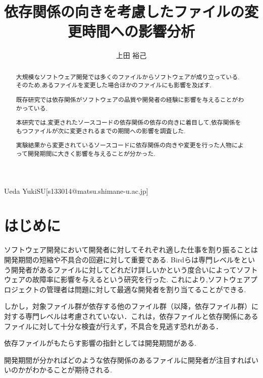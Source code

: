 \documentclass[submit,ses,noauthor]{ipsj} %
\begin{document}
\title{依存関係の向きを考慮したファイルの変更時間への影響分析}

\etitle{}



\author{上田 裕己}{Ueda Yuki}{SU}[s133014@matsu.shimane-u.ac.jp]

\begin{abstract}
大規模なソフトウェア開発では多くのファイルからソフトウェアが成り立っている.
そのため,あるファイルを変更した場合ほかのファイルにも影響を及ぼす.

既存研究では依存関係がソフトウェアの品質や開発者の経験に影響を与えることがわかっている.

本研究では,変更されたソースコードの依存関係の依存の向きに着目して,依存関係をもつファイルが次に変更されるまでの期間への影響を調査した.
 
実験結果から変更されているソースコードに依存関係の向きや変更を行った人物によって開発期間に大きく影響を与えることが分かった.
  

\end{abstract}

\maketitle

\section{はじめに} 
ソフトウェア開発において開発者に対してそれぞれ適した仕事を割り振ることは開発期間の短縮や不具合の回避に対して重要である.
Bird\cite{Bird}らは専門レベルをという開発者があるファイルに対してどれだけ詳しいかという度合いによってソフトウェアの故障率に影響を与えるという研究を行った.
これにより,ソフトウェアプロジェクトの管理者は問題に対して最適な開発者を割り当てることができる.

しかし，対象ファイル群が依存する他のファイル群（以降，依存ファイル群）に対する専門レベルは考慮されていない．これは，依存ファイルと依存関係にあるファイルに対して十分な検査が行えず，不具合を見逃す恐れがある．



依存ファイルがもたらす影響の指針としては開発期間がある.

開発期間が分かればどのような依存関係のあるファイルに開発者が注目すればいいのかがわかることが期待される.
\end{document}
